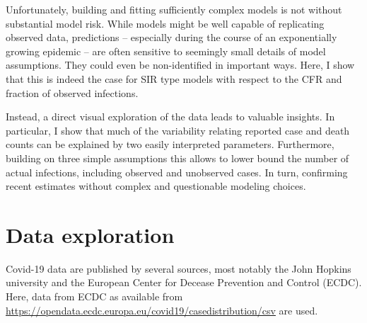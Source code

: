 \documentclass[fullpage,a4paper]{article}
\begin{document}
Unfortunately, building and fitting sufficiently complex models is not
without substantial model risk. While models might be well capable of
replicating observed data, predictions -- especially during the course
of an exponentially growing epidemic -- are often sensitive to
seemingly small details of model assumptions. They could even be
non-identified in important ways. Here, I show that this is indeed the
case for SIR type models with respect to the CFR and fraction of
observed infections.

Instead, a direct visual exploration of the data leads to valuable
insights. In particular, I show that much of the variability relating
reported case and death counts can be explained by two easily
interpreted parameters. Furthermore, building on three simple
assumptions this allows to lower bound the number of actual
infections, including observed and unobserved cases. In turn,
confirming recent estimates without complex and questionable modeling
choices.

\section{Data exploration}

Covid-19 data are published by several sources, most notably the John
Hopkins university and the European Center for Decease Prevention and
Control (ECDC). Here, data from ECDC as available from
\url{https://opendata.ecdc.europa.eu/covid19/casedistribution/csv} are
used.
\end{document}
